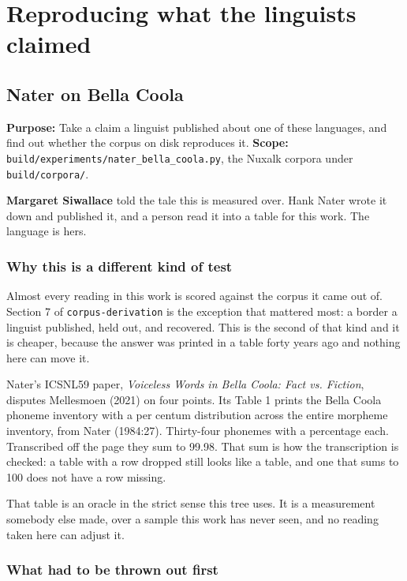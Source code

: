 \chapter{Reproducing what the linguists claimed}

\section{Nater on Bella Coola}

\textbf{Purpose:} Take a claim a linguist published about one of these languages, and find out
whether the corpus on disk reproduces it. \textbf{Scope:}
\texttt{build/\allowbreak{}experiments/\allowbreak{}nater\_\allowbreak{}bella\_\allowbreak{}coola.\allowbreak{}py},
the Nuxalk corpora under \texttt{build/\allowbreak{}corpora/\allowbreak{}}.

\textbf{Margaret Siwallace} told the tale this is measured over. Hank Nater wrote it down and
published it, and a person read it into a table for this work. The language is hers.

\subsection{Why this is a different kind of test}

Almost every reading in this work is scored against the corpus it came out of. Section 7 of
\texttt{corpus-\allowbreak{}derivation} is the exception that mattered most: a border a linguist
published, held out, and recovered. This is the second of that kind and it is cheaper, because the
answer was printed in a table forty years ago and nothing here can move it.

Nater's ICSNL59 paper, \emph{Voiceless Words in Bella Coola: Fact vs. Fiction}, disputes Mellesmoen
(2021) on four points. Its Table 1 prints the Bella Coola phoneme inventory with a per centum
distribution across the entire morpheme inventory, from Nater (1984:27). Thirty-four phonemes with
a percentage each. Transcribed off the page they sum to 99.98. That sum is how the transcription is
checked: a table with a row dropped still looks like a table, and one that sums to 100 does not have
a row missing.

That table is an oracle in the strict sense this tree uses. It is a measurement somebody else made,
over a sample this work has never seen, and no reading taken here can adjust it.

\subsection{What had to be thrown out first}

